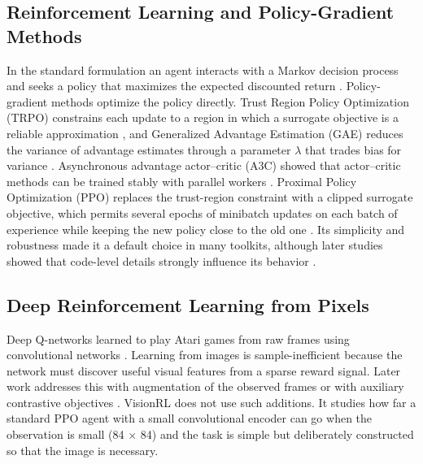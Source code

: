 \documentclass[conference]{IEEEtran}
\begin{document}
\subsection{Reinforcement Learning and Policy-Gradient Methods}
In the standard formulation an agent interacts with a Markov decision process and seeks a policy that maximizes the expected discounted return \cite{sutton2018}. Policy-gradient methods optimize the policy directly. Trust Region Policy Optimization (TRPO) constrains each update to a region in which a surrogate objective is a reliable approximation \cite{schulman2015trpo}, and Generalized Advantage Estimation (GAE) reduces the variance of advantage estimates through a parameter $\lambda$ that trades bias for variance \cite{schulman2016gae}. Asynchronous advantage actor--critic (A3C) showed that actor--critic methods can be trained stably with parallel workers \cite{mnih2016a3c}. Proximal Policy Optimization (PPO) replaces the trust-region constraint with a clipped surrogate objective, which permits several epochs of minibatch updates on each batch of experience while keeping the new policy close to the old one \cite{schulman2017ppo}. Its simplicity and robustness made it a default choice in many toolkits, although later studies showed that code-level details strongly influence its behavior \cite{engstrom2020implementation,andrychowicz2021what}.


\subsection{Deep Reinforcement Learning from Pixels}
Deep Q-networks learned to play Atari games from raw frames using convolutional networks \cite{mnih2013atari,mnih2015dqn}. Learning from images is sample-inefficient because the network must discover useful visual features from a sparse reward signal. Later work addresses this with augmentation of the observed frames \cite{kostrikov2021drq} or with auxiliary contrastive objectives \cite{laskin2020curl}. VisionRL does not use such additions. It studies how far a standard PPO agent with a small convolutional encoder can go when the observation is small (84 $\times$ 84) and the task is simple but deliberately constructed so that the image is necessary.
\end{document}
